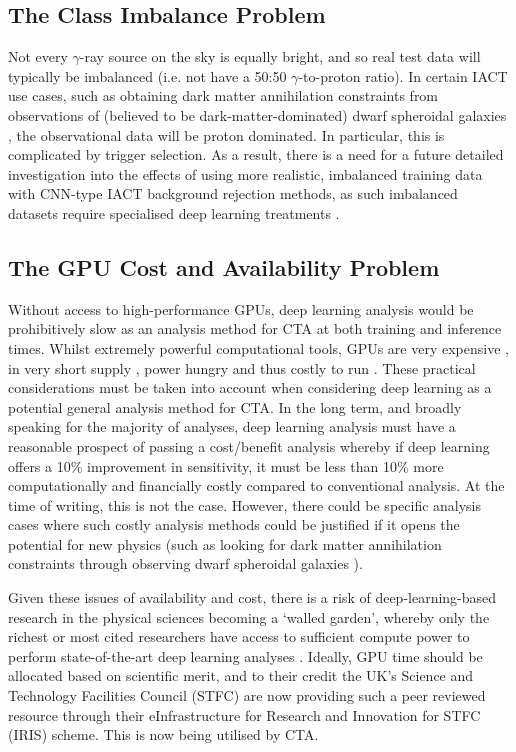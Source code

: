 \subsection{The Class Imbalance Problem}

Not every $\gamma$-ray source on the sky is equally bright, and so real test data will typically be imbalanced (i.e. not have a 50:50 $\gamma$-to-proton ratio). In certain IACT use cases, such as obtaining dark matter annihilation constraints from observations of (believed to be dark-matter-dominated) dwarf spheroidal galaxies \cite{gloryduck}, the observational data will be proton dominated. In particular, this is complicated by trigger selection. As a result, there is a need for a future detailed investigation into the effects of using more realistic, imbalanced training data with CNN-type IACT background rejection methods, as such imbalanced datasets require specialised deep learning treatments \cite{imbalance}.

\subsection{The GPU Cost and Availability Problem}
Without access to high-performance GPUs, deep learning analysis would be prohibitively slow as an analysis method for CTA at both training and inference times. Whilst extremely powerful computational tools, GPUs are very expensive \cite{gpucost}, in very short supply \cite{gpushort}, power hungry \cite{2080ti} and thus costly to run \cite{2080ti}. These practical considerations must be taken into account when considering deep learning as a potential general analysis method for CTA. In the long term, and broadly speaking for the majority of analyses, deep learning analysis must have a reasonable prospect of passing a cost/benefit analysis whereby if deep learning offers a 10\% improvement in sensitivity, it must be less than 10\% more computationally and financially costly compared to conventional analysis. At the time of writing, this is not the case. However, there could be specific analysis cases where such costly analysis methods could be justified if it opens the potential for new physics (such as looking for dark matter annihilation constraints through observing dwarf spheroidal galaxies \cite{gloryduck}).

Given these issues of availability and cost, there is a risk of deep-learning-based research in the physical sciences becoming a `walled garden', whereby only the richest or most cited researchers have access to sufficient compute power to perform state-of-the-art deep learning analyses \cite{gpudivide}. Ideally, GPU time should be allocated based on scientific merit, and to their credit the UK's Science and Technology Facilities Council (STFC) are now providing such a peer reviewed resource through their eInfrastructure for Research and Innovation for STFC (IRIS) scheme. This is now being utilised by CTA.
